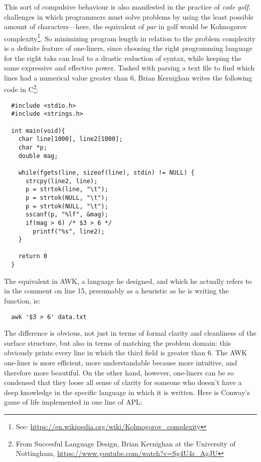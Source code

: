 \documentclass{article}
\begin{document}
This sort of compulsive behaviour is also manifested in the practice of \emph{code golf}, challenges in which programmers must solve problems by using the least possible amount of characters—here, the equivalent of \emph{par} in golf would be Kolmogorov complexity\footnote{See: \url{https://en.wikipedia.org/wiki/Kolmogorov_complexity}}. So minimizing program length in relation to the problem complexity is a definite feature of one-liners, since choosing the right programming language for the right taks can lead to a drastic reduction of syntax, while keeping the same expressive and effective power. Tasked with parsing a text file to find which lines had a numerical value greater than 6, Brian Kernighan writes the following code in C\footnote{From Succesful Language Design, Brian Kernighan at the University of Nottingham, \url{https://www.youtube.com/watch?v=Sg4U4r_AgJU}}:

\pagebreak

\begin{lstlisting}
  #include <stdio.h>
  #include <strings.h>

  int main(void){
    char line[1000], line2[1000];
    char *p;
    double mag;

    while(fgets(line, sizeof(line), stdin) != NULL) {
      strcpy(line2, line);
      p = strtok(line, "\t");
      p = strtok(NULL, "\t");
      p = strtok(NULL, "\t");
      sscanf(p, "%lf", &mag);
      if(mag > 6) /* $3 > 6 */
        printf("%s", line2); 
    }

    return 0
  }
\end{lstlisting}

The equivalent in AWK, a language he designed, and which he actually refers to in the comment on line 15, presumably as a heuristic as he is writing the function, is:

\begin{lstlisting}
  awk '$3 > 6' data.txt
\end{lstlisting}

The difference is obvious, not just in terms of formal clarity and cleanliness of the surface structure, but also in terms of matching the problem domain: this obviously prints every line in which the third field is greater than 6. The AWK one-liner is more efficient, more understandable because more intuitive, and therefore more beautiful. On the other hand, however, one-liners can be so condensed that they loose all sense of clarity for someone who doesn't have a deep knowledge in the specific language in which it is written. Here is Conway's game of life implemented in one line of APL:
\end{document}
